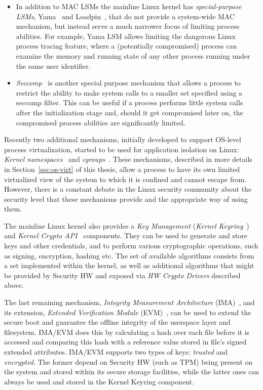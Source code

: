 \begin{itemize}
	\item In addition to MAC LSMs the mainline Linux kernel has \textit{special-purpose LSMs}, Yama~\cite{yama} and Loadpin~\cite{loadpin}, that do not provide a system-wide MAC mechanism, but instead serve a much narrower focus of limiting process abilities. For example, Yama LSM allows limiting the dangerous Linux process tracing feature, where a (potentially compromised) process can examine the memory and running state of any other process running under the same user identifier. 
	\item \textit{Seccomp}~\cite{seccomp2016} is another special purpose mechanism that allows a process to restrict the ability to make system calls to a smaller set specified using a seccomp filter. This can be useful if a process performs little system calls after the initialization stage and, should it get compromised later on, the compromised process abilities are significantly limited.
\end{itemize} 

Recently two additional mechanisms, initially developed to support OS-level process virtualization, started to be used for application isolation on Linux: \textit{Kernel namespaces}~\cite{biederman2006} and \textit{cgroups}~\cite{cgroupsv2}. These mechanisms, described in more details in Section~\ref{sec:os-virt} of this thesis, allow a process to have its own limited virtualized view of the system to which it is confined and cannot escape from. However, there is a constant debate in the Linux security community about the security level that these mechanisms provide and the appropriate way of using them.   

The mainline Linux kernel also provides a \textit{Key Management} (\textit{Kernel Keyring}~\cite{keyrings}) and \textit{Kernel Crypto API}~\cite{kernelcryptoapi} components. They can be used to generate and store keys and other credentials, and to perform various cryptographic operations, such as signing, encryption, hashing etc. The set of available algorithms consists from a set implemented within the kernel, as well as additional algorithms that might be provided by Security HW and exposed via \textit{HW Crypto Drivers} described above.

The last remaining mechanism, \textit{Integrity Measurement Architecture} (IMA)~\cite{ima}, and its extension, \textit{Extended Verification Module} (EVM)~\cite{ima}, can be used to extend the secure boot and guarantee the offline integrity of the userspace layer and filesystem. IMA/EVM does this by calculating a hash over each file before it is accessed and comparing this hash with a reference value stored in file's signed extended attributes. IMA/EVM supports two types of keys: \textit{trusted} and \textit{encrypted}. The former depend on Security HW (such as TPM) being present on the system and stored within its secure storage facilities, while the latter ones can always be used and stored in the Kernel Keyring component. 

